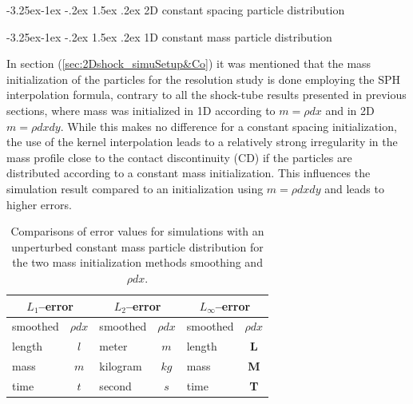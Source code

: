 \documentclass{report}
\makeatletter
\renewcommand\paragraph{\@startsection{paragraph}{4}{\z@}%
  {-3.25ex\@plus -1ex \@minus -.2ex}%
  {1.5ex \@plus .2ex}%
  {\normalfont\normalsize\bfseries}}
\makeatother
\begin{document}
\paragraph{2D constant spacing particle distribution}


\paragraph{1D constant mass particle distribution}

In section (\ref{sec:2Dshock_simuSetup&Co}) it was mentioned that the mass initialization of the particles for the resolution study is done employing the SPH interpolation formula, contrary to all the shock-tube results presented in previous sections, where mass was initialized in 1D according to $m=\rho dx$ and in 2D $m=\rho dx dy$. While this makes no difference for a constant spacing initialization, the use of the 
kernel interpolation leads to a relatively strong irregularity in the mass profile close to the contact discontinuity (CD) if the particles are distributed according to a constant mass initialization. This  influences the simulation result compared to an initialization using $m=\rho dx dy$ and leads to higher errors.  

\begin{table}[h] %
\label{tab:2D_shock_m_smoothed_versus_rhodx}
\centering

\begin{tabular}[c]{|l| c|l| c|l| c|} %
\hline
\hline
\multicolumn{2}{|c|}{\textbf{$L_1$--error}} & \multicolumn{2}{|c|}{\textbf{$L_2$--error}} & \multicolumn{2}{|c|}{\textbf{$L_{\infty}$--error}}\\
\hline
smoothed & $\rho dx$ & smoothed & $\rho dx$& smoothed & $\rho dx$\\
\hline
\hline
length & $l$ & meter & $m$ & length & {\bf L}\\

mass & $m$ & kilogram & $kg$ & mass & {\bf M} \\

time & $t$ & second & $s$ & time & {\bf T}\\

\hline
\hline
\end{tabular}
\caption[]{Comparisons of error values for simulations with an unperturbed constant mass particle distribution for the two mass initialization methods smoothing and $\rho dx$.}

\end{table}
\end{document}
